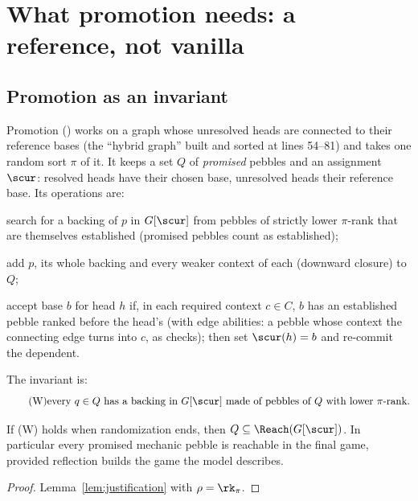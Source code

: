 \section{What promotion needs: a reference, not vanilla}\label{sec:reference}

\subsection{Promotion as an invariant}

Promotion () works on a graph whose unresolved heads are connected to their reference bases (the ``hybrid graph'' built and sorted at lines 54--81) and takes one random sort $\pi$ of it. It keeps a set $Q$ of \emph{promised} pebbles and an assignment $\scur$: resolved heads have their chosen base, unresolved heads their reference base. Its operations are:
\begin{description}[nosep, font=\normalfont\itshape]
\item[establish$(p)$] search for a backing of $p$ in $G[\scur]$ from pebbles of strictly lower $\pi$-rank that are themselves established (promised pebbles count as established);
\item[commit$(p)$] add $p$, its whole backing and every weaker context of each (downward closure) to $Q$;
\item[resolve$(h,b,C)$] accept base $b$ for head $h$ if, in each required context $c\in C$, $b$ has an established pebble ranked before the head's (with edge abilities: a pebble whose context the connecting edge turns into $c$, as  checks); then set $\scur(h)=b$ and re-commit the dependent.
\end{description}
The invariant is:
\begin{equation}\tag{W}
\text{every } q\in Q \text{ has a backing in } G[\scur] \text{ made of pebbles of } Q \text{ with lower } \pi\text{-rank.}
\end{equation}

\begin{theorem}[Soundness]\label{thm:sound}
If (W) holds when randomization ends, then $Q\subseteq\Reach(G[\scur])$. In particular every promised mechanic pebble is reachable in the final game, provided reflection builds the game the model describes.
\end{theorem}
\begin{proof}
Lemma~\ref{lem:justification} with $\rho=\rk_\pi$.
\end{proof}

